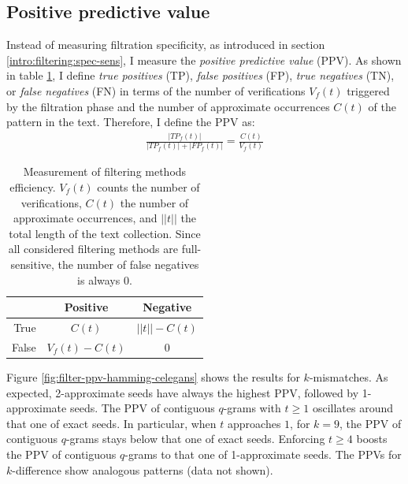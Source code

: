 
\subsection{Positive predictive value}

Instead of measuring filtration specificity, as introduced in section \ref{intro:filtering:spec-sens}, I measure the \emph{positive predictive value} (PPV).
As shown in table \ref{tab:filter:ppv}, I define \emph{true positives} (TP), \emph{false positives} (FP), \emph{true negatives} (TN), or \emph{false negatives} (FN) in terms of the number of verifications $V_f(t)$ triggered by the filtration phase and the number of approximate occurrences $C(t)$ of the pattern in the text.
Therefore, I define the PPV as:
\begin{eqnarray}
\frac{|TP_f(t)|}{|TP_f(t)| + |FP_f(t)|} = \frac{C(t)}{V_f(t)}
\end{eqnarray}

\begin{table}[t]
\begin{center}
\caption[Measurement of filtering methods efficiency]{Measurement of filtering methods efficiency. $V_f(t)$ counts the number of verifications, $C(t)$ the number of approximate occurrences, and $||t||$ the total length of the text collection. Since all considered filtering methods are full-sensitive, the number of false negatives is always 0.}
\begin{tabular}{rcc}
\toprule
  & Positive & Negative\\
\midrule
True & $C(t)$ & $||t|| - C(t)$ \\
False & $V_f(t) - C(t)$ & 0		\\
\bottomrule
\end{tabular}
\label{tab:filter:ppv}
\end{center}
\end{table}

Figure \ref{fig:filter-ppv-hamming-celegans} shows the results for $k$-mismatches.
As expected, 2-approximate seeds have always the highest PPV, followed by 1-approximate seeds.
The PPV of contiguous $q$-grams with $t \geq 1$ oscillates around that one of exact seeds.
In particular, when $t$ approaches $1$, \eg for $k = 9$, the PPV of contiguous $q$-grams stays below that one of exact seeds.
Enforcing $t \geq 4$ boosts the PPV of contiguous $q$-grams to that one of 1-approximate seeds.
The PPVs for $k$-difference show analogous patterns (data not shown).

